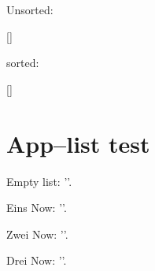 \documentclass[a4paper]{article}
\begin{document}
{Unsorted:

[\pgfplotsarrayforeach\testarray\as\elem{\elem\space}]

\pgfplotsarraysort\testarray

sorted:

[\pgfplotsarrayforeach\testarray\as\elem{\elem\space}]

}


\section{App--list test}
{

\pgfplotsapplistnewempty\foolist

\pgfplotsapplistedefcontenttomacro\foolist\to\content
Empty list: '\content'.

\pgfplotsapplistpushback Eins\to\foolist
\pgfplotsapplistedefcontenttomacro\foolist\to\content
Now: '\content'.

\pgfplotsapplistpushback Zwei\to\foolist
\pgfplotsapplistedefcontenttomacro\foolist\to\content
Now: '\content'.

\pgfplotsapplistpushback Drei\to\foolist
\pgfplotsapplistedefcontenttomacro\foolist\to\content
Now: '\content'.
}

% 
\end{document}
